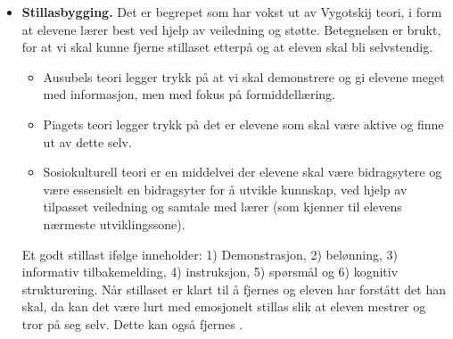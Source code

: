 \documentclass[12pt,a4paper]{article}
\begin{document}
\begin{itemize}
For å undersøke elevens aktuelle utviklingsnivå og nærmeste utviklingssone kan vi skille mellom tradisjonell og dynamisk testing:
\begin{itemize}
    \item \textbf{Tradisjonell skriftlig testing.} Undersøker hva eleven mestrer selvstendig, uten hjelp, og gir dermed informasjon om elevens aktuelle utviklingsnivå innenfor det som testes.
    \item \textbf{Dynamisk testing.} Undersøker hva eleven mestrer med veiledning, og hvilken støtte eleven trenger for å komme videre. Dette gir innsikt i elevens nærmeste utviklingssone. Typisk er dette en å gi hint i form av spørsmål, forslag
        veiledning og forklaring,  eller gjenfortelling feks muntlig test. For vurdering spesifikt, vil man også teste deres evne i praksis: Dvs fokusere på mappeinnleveringer  og dens enkelts elev arbeid i den gruppen. 

\end{itemize}

     Vi må også huske å jobbe i den aktuelle læringssonen er viktig, for å få automatisering og effektivitet. Det vil si pugge gloser og gangetabellen.
     Se mer i \textcite[69]{skaalvik2021skolen}.

 \item \textbf{Stillasbygging.} Det er begrepet som har vokst ut av Vygotskij teori, i form at elevene lærer best ved hjelp av veiledning og støtte. Betegnelsen er brukt, for at vi skal kunne fjerne stillaset etterpå og at eleven skal bli
     selvstendig.
     \begin{itemize}
         \item Ausubels teori legger trykk på at vi skal demonstrere og gi elevene meget med informasjon, men med fokus på formiddellæring. 
         \item Piagets teori legger trykk på det er elevene som skal være aktive og finne ut av dette selv. 
         \item Sosiokulturell teori er en middelvei der elevene skal være bidragsytere og være essensielt en bidragsyter for å utvikle kunnskap, ved hjelp av tilpasset veiledning og samtale med lærer (som kjenner til elevens nærmeste utviklingssone).
     \end{itemize}

     Et godt stillast ifølge \textcite{tharp1988rousing} inneholder: 1) Demonstrasjon, 2) belønning, 3) informativ tilbakemelding, 4) instruksjon, 5) spørsmål og 6) kognitiv strukturering. Når stillaset er klart til å fjernes og eleven har forstått
     det han skal, da kan det være lurt med emosjonelt stillas slik at eleven mestrer og tror på seg selv. Dette kan også fjernes \parencite[71]{skaalvik2021skolen}.  



\end{itemize}
\end{document}
